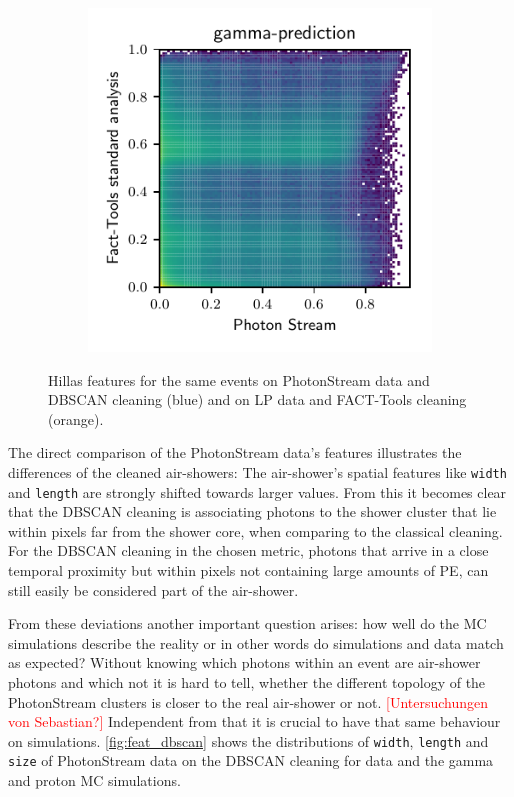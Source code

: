\begin{figure}
\begin{subfigure}{0.5\textwidth}
  \end{subfigure}
  \begin{subfigure}{0.5\textwidth}
    \centering
    \includegraphics[width=\textwidth, page=4]{Plots/comparison_data_dl3.pdf}
  \end{subfigure}
  \caption{Hillas features for the same events on PhotonStream data and DBSCAN cleaning (blue) and on LP data and FACT-Tools cleaning (orange).}
  \label{fig:feat_comp}
\end{figure}
%
The direct comparison of the PhotonStream data's features illustrates the
differences of the cleaned air-showers: The air-shower's spatial features like
\texttt{width} and \texttt{length} are strongly shifted towards larger values.
From this it becomes clear that the DBSCAN cleaning is associating photons to
the shower cluster that lie within pixels far from the shower core, when
comparing to the classical cleaning. For the DBSCAN cleaning in the chosen
metric, photons that arrive in a close temporal proximity but within pixels not
containing large amounts of PE, can still easily be considered part of the
air-shower.

From these deviations another important question arises: how well do the MC
simulations describe the reality or in other words do simulations and data
match as expected? Without knowing which photons within an event are air-shower
photons and which not it is hard to tell, whether the different topology of the
PhotonStream clusters is closer to the real air-shower or not.
\textcolor{red}{[Untersuchungen von Sebastian?]} Independent from that it is crucial to
have that same behaviour on simulations. \autoref{fig:feat_dbscan} shows the
distributions of \texttt{width}, \texttt{length} and \texttt{size} of
PhotonStream data on the DBSCAN cleaning for data and the gamma and proton MC
simulations.

